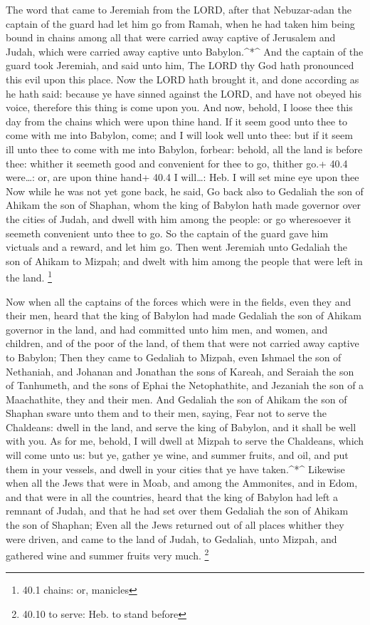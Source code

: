 The word that came to Jeremiah from the LORD, after that
Nebuzar-adan the captain of the guard had let him go from Ramah, when he
had taken him being bound in chains among all that were carried away
captive of Jerusalem and Judah, which were carried away captive unto
Babylon.\^{}*\^{}  And the captain of the guard took
Jeremiah, and said unto him, The LORD thy God hath pronounced this evil
upon this place.  Now the LORD hath brought it, and done
according as he hath said: because ye have sinned against the LORD, and
have not obeyed his voice, therefore this thing is come upon you.
 And now, behold, I loose thee this day from the chains
which were upon thine hand. If it seem good unto thee to come with me
into Babylon, come; and I will look well unto thee: but if it seem ill
unto thee to come with me into Babylon, forbear: behold, all the land is
before thee: whither it seemeth good and convenient for thee to go,
thither go.+ 40.4 were\ldots: or, are upon thine hand+ 40.4 I
will\ldots: Heb. I will set mine eye upon thee  Now while he
was not yet gone back, he said, Go back also to Gedaliah the son of
Ahikam the son of Shaphan, whom the king of Babylon hath made governor
over the cities of Judah, and dwell with him among the people: or go
wheresoever it seemeth convenient unto thee to go. So the captain of the
guard gave him victuals and a reward, and let him go.  Then
went Jeremiah unto Gedaliah the son of Ahikam to Mizpah; and dwelt with
him among the people that were left in the land. \footnote{40.1 chains:
  or, manicles}

 Now when all the captains of the forces which were in the
fields, even they and their men, heard that the king of Babylon had made
Gedaliah the son of Ahikam governor in the land, and had committed unto
him men, and women, and children, and of the poor of the land, of them
that were not carried away captive to Babylon;  Then they
came to Gedaliah to Mizpah, even Ishmael the son of Nethaniah, and
Johanan and Jonathan the sons of Kareah, and Seraiah the son of
Tanhumeth, and the sons of Ephai the Netophathite, and Jezaniah the son
of a Maachathite, they and their men.  And Gedaliah the son
of Ahikam the son of Shaphan sware unto them and to their men, saying,
Fear not to serve the Chaldeans: dwell in the land, and serve the king
of Babylon, and it shall be well with you.  As for me,
behold, I will dwell at Mizpah to serve the Chaldeans, which will come
unto us: but ye, gather ye wine, and summer fruits, and oil, and put
them in your vessels, and dwell in your cities that ye have
taken.\^{}*\^{}  Likewise when all the Jews that were in
Moab, and among the Ammonites, and in Edom, and that were in all the
countries, heard that the king of Babylon had left a remnant of Judah,
and that he had set over them Gedaliah the son of Ahikam the son of
Shaphan;  Even all the Jews returned out of all places
whither they were driven, and came to the land of Judah, to Gedaliah,
unto Mizpah, and gathered wine and summer fruits very much. \footnote{40.10
  to serve: Heb. to stand before}

